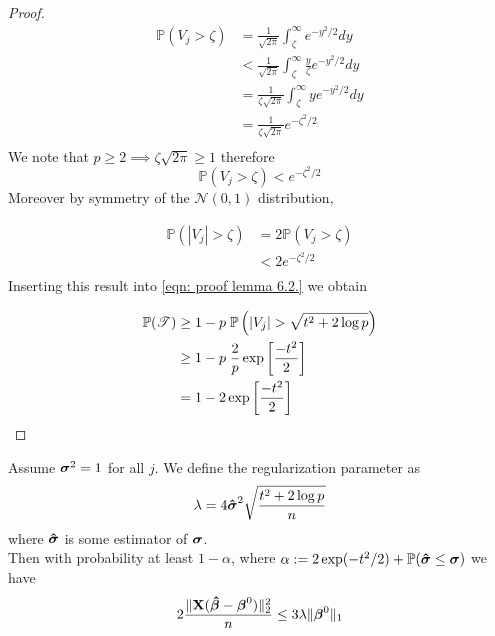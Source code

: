 \begin{proof}
    \begin{align*}
        \mathbb{P}(V_j > \zeta) & = \frac{1}{\sqrt{2\pi}} \int_\zeta^{\infty} e^{-y^2/2} dy                     \\
                                & < \frac{1}{\sqrt{2\pi}} \int_\zeta^{\infty} \frac{y}{\zeta} e^{-y^2 / 2} dy \\
                                & = \frac{1}{\zeta \sqrt{2\pi}} \int_\zeta^{\infty} y e^{-y^2 / 2} dy         \\
                                & = \frac{1}{\zeta\sqrt{2\pi}} e^{-\zeta^2/2}                                   \\
    \end{align*}
    We note that $p \geq 2 \implies \zeta \sqrt{2 \pi} \geq 1$ therefore
    $$
        \mathbb{P}(V_j > \zeta) <  e^{-\zeta^2/2}
    $$
    Moreover by symmetry of the $\mathscr{N} (0,1)$ distribution,

    \begin{align*}
        \mathbb{P} (|V_j| > \zeta) & = 2 \mathbb{P} (V_j > \zeta)                              \\
                                   & < 2 e^{-\zeta^2/2}                                        \\
    \end{align*}
    Inserting this result into \eqref{eqn: proof lemma 6.2.} we obtain

    \begin{align*}
        \mathbb{P}(\mathscr{T}) & \geq 1 - p \; \P \left( | V_{j} | > \sqrt{t^{2}+2 \log p}  \right) \\
                                & \geq 1 - p \; \frac{2}{p} \exp \left[ \frac{- t^{2}}{2} \right]    \\
                                & = 1 - 2 \exp \left[ \frac{- t^{2}}{2} \right]                      \\
    \end{align*}
\end{proof}

\begin{corollary}
    Assume $\sgm^2 = 1$ for all $j$. We define the regularization parameter as
    $$\lambda = 4 \sgmhat^2 \sqrt{\frac{t^2 + 2 \log p}{n}}$$
    where $\sgmhat$ is some estimator of $\sgm$. \\
    Then with probability at least $1 - \alpha$, where $\alpha := 2 \exp(-t^2/2) + \P (\sgmhat \leq \sgm)$ we have
    $$2 \frac{\| \X (\btahat - \bta^0)\|_2^2}{n} \leq 3 \lambda \| \bta^0 \|_1$$
\end{corollary}


